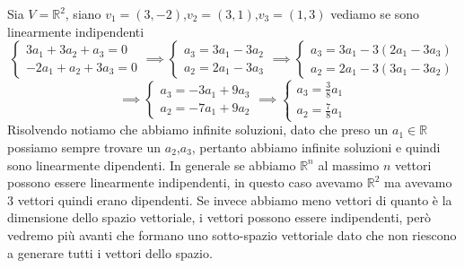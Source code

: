 \documentclass{rapport}
\begin{document}
\newpage
Sia $V=\mathbb{R}^2$, siano $v_1=(3,-2)$,$v_2=(3,1)$,$v_3=(1,3)$ vediamo se sono linearmente indipendenti
\[
\begin{cases}
  3a_1+3a_2+a_3 = 0 \\
  -2a_1+a_2+3a_3 = 0
\end{cases} \implies
\begin{cases}
  a_3 = 3a_1-3a_2 \\
  a_2 = 2a_1-3a_3
\end{cases} \implies 
\begin{cases}
  a_3 = 3a_1-3(2a_1-3a_3) \\
  a_2 = 2a_1-3(3a_1-3a_2)
\end{cases} 
\]
\[
\implies\begin{cases}
  a_3 = -3a_1 + 9a_3 \\
  a_2 = -7a_1+9a_2
\end{cases} \implies
\begin{cases}
  a_3 = \frac{3}{8}a_1 \\
  a_2 = \frac{7}{8}a_1
\end{cases}
\]
Risolvendo notiamo che abbiamo infinite soluzioni, dato che preso un $a_1\in\mathbb{R}$ possiamo sempre trovare un $a_2$,$a_3$, pertanto abbiamo infinite soluzioni e quindi sono linearmente dipendenti. In generale se abbiamo $\mathbb{R}^n$ al massimo $n$ vettori possono essere linearmente indipendenti, in questo caso avevamo $\mathbb{R}^2$ ma avevamo 3 vettori quindi erano dipendenti. Se invece abbiamo meno vettori di quanto è la dimensione dello spazio vettoriale, i vettori possono essere indipendenti, però vedremo più avanti che formano uno sotto-spazio vettoriale dato che non riescono a generare tutti i vettori dello spazio.
\end{document}
